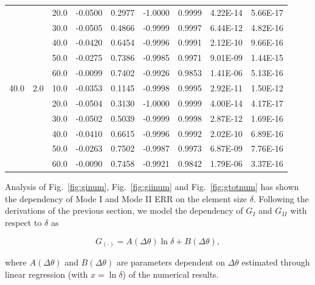\documentclass[review]{elsarticle}
\begin{document}
\begin{table}[!h]
\begin{tabular}{ccccccccc}
&\small&\small		20.0&\small	-0.0500&\small	0.2977&\small	-1.0000&\small	0.9999&\small	4.22E-14&\small	5.66E-17\\
&\small&\small		30.0&\small	-0.0505&\small	0.4866&\small	-0.9999&\small	0.9997&\small	6.44E-12&\small	4.82E-16\\
&\small&\small		40.0&\small	-0.0420&\small	0.6454&\small	-0.9996&\small	0.9991&\small	2.12E-10&\small	9.66E-16\\
&\small&\small		50.0&\small	-0.0275&\small	0.7386&\small	-0.9985&\small	0.9971&\small	9.01E-09&\small	1.44E-15\\
&\small&\small		60.0&\small	-0.0099&\small	0.7402&\small	-0.9926&\small	0.9853&\small	1.41E-06&\small	5.13E-16\\
\midrule
\small40.0&\small	2.0&\small	10.0&\small	-0.0353&\small	0.1145&\small	-0.9998&\small	0.9995&\small	2.92E-11&\small	1.50E-12\\
&\small&\small		20.0&\small	-0.0504&\small	0.3130&\small	-1.0000&\small	0.9999&\small	4.00E-14&\small	4.17E-17\\
&\small&\small		30.0&\small	-0.0502&\small	0.5039&\small	-0.9999&\small	0.9998&\small	2.87E-12&\small	1.69E-16\\
&\small&\small		40.0&\small	-0.0410&\small	0.6615&\small	-0.9996&\small	0.9992&\small	2.02E-10&\small	6.89E-16\\
&\small&\small		50.0&\small	-0.0263&\small	0.7502&\small	-0.9987&\small	0.9973&\small	6.87E-09&\small	7.76E-16\\
&\small&\small		60.0&\small	-0.0090&\small	0.7458&\small	-0.9921&\small	0.9842&\small	1.79E-06&\small	3.37E-16\\
\end{tabular}
\end{table}

Analysis of Fig.~\ref{fig:ginum}, Fig.~\ref{fig:giinum} and Fig.~\ref{fig:gtotnum} has shown the dependency of Mode I and Mode II ERR on the element size $\delta$. Following the derivations of the previous section, we model the dependency of $G_{I}$ and $G_{II}$ with respect to $\delta$ as

\begin{equation}
G_{\left(\cdot\right)}=A\left(\Delta\theta\right)\ln\delta+B\left(\Delta\theta\right),
\end{equation}

where $A\left(\Delta\theta\right)$ and $B\left(\Delta\theta\right)$ are parameters dependent on $\Delta\theta$ estimated through linear regression (with $x=\ln\delta$) of the numerical results.
\end{document}
